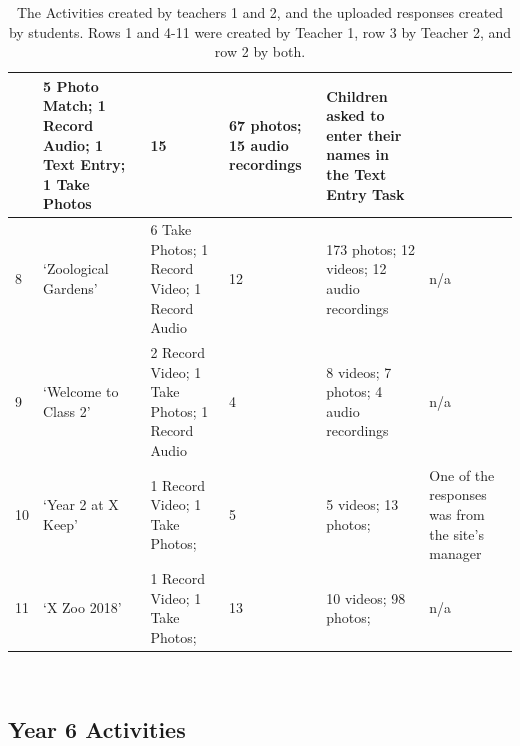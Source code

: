 \begin{table}[]
\begin{tabularx}{\linewidth}{ 
| p{4mm} 
| >{\raggedright\arraybackslash}X 
| >{\raggedright\arraybackslash}X 
| p{13mm}
| >{\raggedright\arraybackslash}X 
| >{\raggedright\arraybackslash}X 
|}
    & \footnotesize 5 Photo Match; 1 Record Audio; 1 Text Entry; 1 Take Photos
    & \footnotesize 15 
    & \footnotesize 67 photos; 15 audio recordings
    & \footnotesize Children asked to enter their names in the Text Entry Task\\
\hline
    \small 8 
    & \footnotesize `Zoological Gardens' 
    & \footnotesize 6 Take Photos; 1 Record Video; 1 Record Audio
    & \footnotesize 12 
    & \footnotesize 173 photos; 12 videos; 12 audio recordings
    & \footnotesize n/a\\
\hline
    \small 9 
    & \footnotesize `Welcome to Class 2' 
    & \footnotesize 2 Record Video; 1 Take Photos; 1 Record Audio
    & \footnotesize 4 
    & \footnotesize 8 videos; 7 photos; 4 audio recordings
    & \footnotesize n/a\\
\hline
    \small 10 
    & \footnotesize `Year 2 at X Keep' 
    & \footnotesize 1 Record Video; 1 Take Photos;
    & \footnotesize 5 
    & \footnotesize 5 videos; 13 photos;
    & \footnotesize One of the responses was from the site's manager\\
    \hline
    \small 11 
    & \footnotesize `X Zoo 2018' 
    & \footnotesize 1 Record Video; 1 Take Photos;
    & \footnotesize 13 
    & \footnotesize 10 videos; 98 photos;
    & \footnotesize n/a\\
\hline
\end{tabularx}
    \caption[The Activities created by teachers 1 and 2, and the uploaded responses created by students.]{The Activities created by teachers 1 and 2, and the uploaded responses created by students. Rows 1 and 4-11 were created by Teacher 1, row 3 by Teacher 2, and row 2 by both.}~\label{tab:TeacherActivities}
\end{table}

\subsection{Year 6 Activities}

